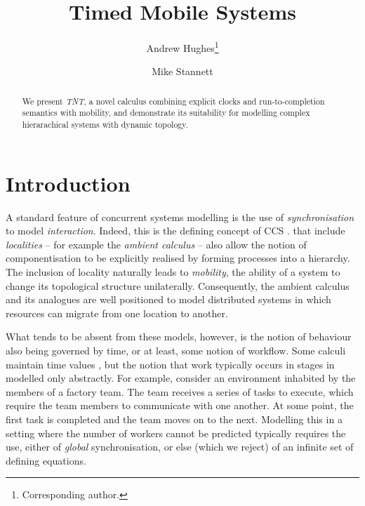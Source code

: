 \documentclass[orivec,envcountsame]{llncs}
\title{Timed Mobile Systems}
\author{Andrew Hughes\thanks{Corresponding author.} \and Mike Stannett}
\institute{Department of Computer Science, University of Sheffield, \\
  Regent Court, 211 Portobello Street, Sheffield S1 4DP, UK. \\
  \email{a.hughes@dcs.shef.ac.uk}
}
\begin{document}
\maketitle

\begin{abstract}

We present \emph{TNT}, a novel calculus combining explicit clocks and
run-to-completion semantics with mobility, and demonstrate its
suitability for modelling complex hierarachical systems with dynamic
topology.

\end{abstract}

\section{Introduction}
\label{introduction}

A standard feature of concurrent systems modelling is the use of
\emph{synchronisation} to model \emph{interaction}. Indeed, this is the
defining concept of CCS \cite{milner:ccs}.  that include
\emph{localities} -- for example the \emph{ambient calculus} \cite{amb}
-- also allow the notion of componentisation to be explicitly realised
by forming processes into a hierarchy. The inclusion of locality
naturally leads to \emph{mobility}, the ability of a system to change
its topological structure unilaterally. Consequently, the ambient
calculus and its analogues are well positioned to model distributed
systems in which resources can migrate from one location to another.

What tends to be absent from these models, however, is the notion of
behaviour also being governed by time, or at least, some notion of
workflow. Some calculi maintain  time values
\cite{tccs,beaten:timing,brics:lee}, but the notion that work typically
occurs in stages in modelled only abstractly. For example, consider an
environment inhabited by the members of a factory team. The team
receives a series of tasks to execute, which require the team members to
communicate with one another. At some point, the first task is completed
and the team moves on to the next. Modelling this in a setting where the
number of workers cannot be predicted typically requires the use, either
of \emph{global} synchronisation, or else (which we reject) of an
infinite set of defining equations.
\end{document}

